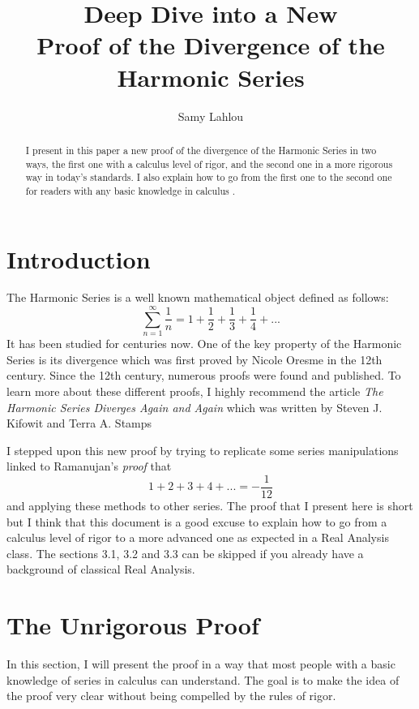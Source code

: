 \documentclass[10pt]{article}
\title{Deep Dive into a New \\ Proof of the Divergence of the Harmonic Series}
\author{Samy Lahlou}
\date{}
\theoremstyle{definition}
\begin{document}
\maketitle

\begin{abstract}
    I present in this paper a new proof of the divergence of the Harmonic Series in two ways, the first one with a calculus level of rigor, and the second one in a more rigorous way in today's standards. I also explain how to go from the first one to the second one for readers with any basic knowledge in calculus .
\end{abstract}

\tableofcontents

\newpage

\section{Introduction}
The Harmonic Series is a well known mathematical object defined as follows:
$$\sum_{n=1}^{\infty}\frac{1}{n} = 1 + \frac{1}{2} + \frac{1}{3} + \frac{1}{4} + ...$$
It has been studied for centuries now. One of the key property of the Harmonic Series is its divergence which was first proved by Nicole Oresme in the 12th century. Since the 12th century, numerous proofs were found and published. To learn more about these different proofs, I highly recommend the article \textit{The Harmonic Series Diverges Again and Again} which was written by Steven J. Kifowit and Terra A. Stamps \cite{harmonicseries} 

I stepped upon this new proof by trying to replicate some series manipulations linked to Ramanujan's \textit{proof} that
$$1 + 2 + 3 + 4 + ... = -\frac{1}{12}$$
and applying these methods to other series. The proof that I present here is short but I think that this document is a good excuse to explain how to go from a calculus level of rigor to a more advanced one as expected in a Real Analysis class. The sections 3.1, 3.2 and 3.3 can be skipped if you already have a background of classical Real Analysis.

\section{The Unrigorous Proof}

In this section, I will present the proof in a way that most people with a basic knowledge of series in calculus can understand. The goal is to make the idea of the proof very clear without being compelled by the rules of rigor. 
\end{document}
